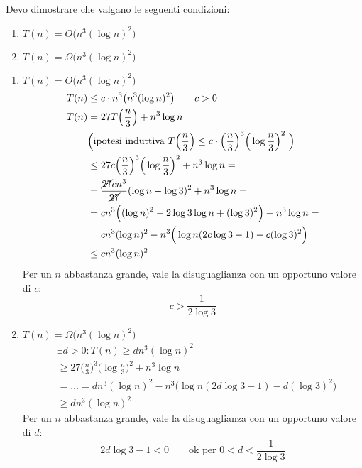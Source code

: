\begin{itemize}[label=$\bullet$]
    Devo dimostrare che valgano le seguenti condizioni:\par 
	\begin{enumerate}
		\item $T(n) = O \big(n^3 (\log n)^2\big)$
		\item $T(n) = \Omega \big(n^3 (\log n)^2\big)$
	\end{enumerate}
    \begin{enumerate}
        \item $T(n) = O \big(n^3 (\log n)^2\big)$
        \begin{align*}
            T(n) & \leq c \cdot n^3 \big(n^3 (\log n)^2\big) \qquad c > 0 \\
            T(n) & = 27T\Big(\frac{n}{3}\Big) + n^3 \log n \qquad \\
            & \Big(\text{ipotesi induttiva } T\Big(\frac{n}{3} \Big) 
                \leq c \cdot \Big(\frac{n}{3} \Big)^3 \Big(\log \frac{n}{3} \Big)^2 \ \Big)\\
            & \leq 27 c \Big(\frac{n}{3} \Big)^3 \Big(\log \frac{n}{3} \Big)^2 + n^3 \log n = \\
            & = \frac{\cancel{27} cn^3}{\cancel{27}} (\log n - \log 3)^2 + n^3 \log n = \\
            & = cn^3 \Big((\log n)^2 - 2\log 3 \log n + (\log 3)^2 \Big) + n^3 \log n = \\
            & = cn^3 (\log n)^2 - n^3 \Big(\log n (2c \log 3 - 1) - c (\log 3)^2 \Big) \\
            & \leq cn^3(\log n)^2
        \end{align*}
        Per un $n$ abbastanza grande, vale la disuguaglianza con un opportuno valore di $c$:
        $$c > \frac{1}{2 \log 3}$$

        \item $T(n) = \Omega \big(n^3 (\log n)^2\big)$
        \begin{align*}
            & \exists d > 0 : T(n) \geq dn^3(\log n)^2 \\
            & \geq 27\Big(\frac{n}{3} \Big)^3 \Big(\log \frac{n}{3} \Big)^2 + n^3 \log n \\
            & = \dots = dn^3 (\log n)^2 - n^3 \Big(\log n (2d \log 3 - 1) - d (\log 3)^2 \Big) \\
            & \geq dn^3 (\log n)^2 
        \end{align*}
        Per un $n$ abbastanza grande, vale la disuguaglianza con un opportuno valore di $d$:
        $$2d\log 3 -1 < 0 \qquad \text{ok per } 0 < d < \frac{1}{2\log 3}$$
    \end{enumerate}
\end{itemize}
